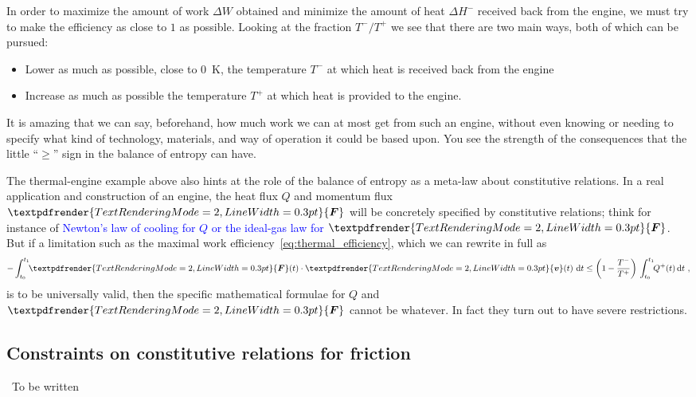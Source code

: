 \documentclass[a4paper,12pt,%
onecolumn,oneside,titlepage,%
british%
]{memoir}
\renewcommand*{\bm}[1]{\textpdfrender{TextRenderingMode=2,LineWidth=0.3pt}{\boldsymbol{#1}}}
\newcommand{\mynotew}[1]{{\footnotesize\color{midgrey}\faIcon{tools}\ #1}}
\newcommand*{\di}{\mathrm{d}}%
\newcommand*{\incr}{\Delta}%
\renewcommand*{\|}[1][]{\nonscript\:#1\vert\nonscript\:\mathopen{}}
\newcommand*{\sect}{\S}%
\renewcommand*{\autoref}[2]{\sidepar{\vspace{-1ex}\footnotesize{\color{blue}\faIcon{%
angle-right%
}\enspace\sect\,\ref{#1} page\,\pageref{#1}}}\textcolor{blue}{#2}}
\newcommand*{\yv}{\bm{v}}
\newcommand*{\yti}{t_{0}}
\newcommand*{\ytf}{t_{1}}
\newcommand*{\yQ}{Q}%
\newcommand*{\yQp}{Q^{+}}%
\newcommand*{\yhem}{\incr H^{-}}%
\newcommand*{\yW}{\incr W}%
\newcommand*{\yF}{\bm{F}}
\newcommand*{\yT}{T}%
\newcommand*{\yTp}{\yT^{+}}%
\newcommand*{\yTm}{\yT^{-}}%
\begin{document}
In order to maximize the amount of work $\yW$ obtained and minimize the amount of heat $\yhem$ received back from the engine, we must try to make the efficiency as close to $1$ as possible. Looking at the fraction $\yTm/\yTp$ we see that there are two main ways, both of which can be pursued:
\begin{itemize}
\item Lower as much as possible, close to \qty{0}{K}, the temperature $\yTm$ at which heat is received back from the engine
\item Increase as much as possible the temperature $\yTp$ at which heat is provided to the engine.
\end{itemize}

\medskip

It is amazing that we can say, beforehand, how much work we can at most get from such an engine, without even knowing or needing to specify what kind of technology, materials, and way of operation it could be based upon. You see the strength of the consequences that the little \enquote{$\ge$} sign in the balance of entropy can have.

The thermal-engine example above also hints at the role of the balance of entropy as a meta-law about constitutive relations. In a real application and construction of an engine, the heat flux $\yQ$ and momentum flux $\yF$ will be concretely specified by constitutive relations; think for instance of \autoref{sec:int_energy_idealgas}{Newton's law of cooling for $\yQ$ or the ideal-gas law for $\yF$}. But if a limitation such as the maximal work efficiency~\eqref{eq:thermal_efficiency}, which we can rewrite in full as
\begin{equation*}
  -\int_{\yti}^{\ytf}\!\!\yF(t)\cdot\yv(t)\ \di t
  \le
  \biggl(1-\frac{\yTm}{\yTp}\biggr)\,
  \int_{\yti}^{\ytf}\!\!\yQp(t)\,\di t \ ,
\end{equation*}
is to be universally valid, then the specific mathematical formulae for $\yQ$ and $\yF$ cannot be whatever. In fact they turn out to have severe restrictions.


\subsection{Constraints on constitutive relations for friction}
\label{sec:friction_entropy}
\mynotew{To be written}



\end{document}
